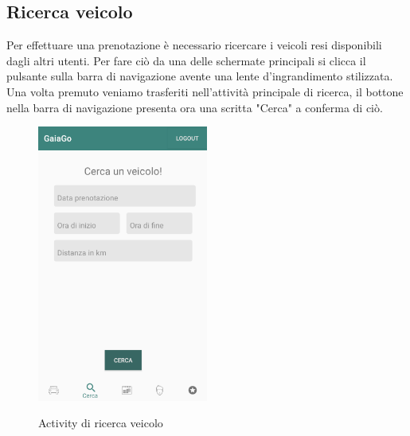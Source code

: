 \subsection{Ricerca veicolo}
Per effettuare una prenotazione è necessario ricercare i veicoli resi disponibili dagli altri utenti. Per fare ciò da una delle schermate principali si clicca il pulsante sulla barra di navigazione avente una lente d'ingrandimento stilizzata. Una volta premuto veniamo trasferiti nell'attività principale di ricerca, il bottone nella barra di navigazione presenta ora una scritta "Cerca" a conferma di ciò.
  \begin{figure}[H] 
 	\centering 
 	\includegraphics[width=0.5\textwidth]{res/images/cerca_veicolo.png}\\
 	\caption{Activity di ricerca veicolo}
 	\label{ricerca}
 \end{figure}
\pagebreak


